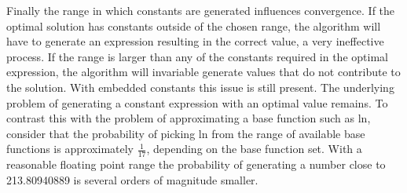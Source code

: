 \documentclass[10pt]{extarticle}
\begin{document}
Finally the range in which constants are generated influences convergence. If the optimal solution has constants outside of the chosen range, the algorithm will have to generate an expression resulting in the correct value, a very ineffective process. If the range is larger than any of the constants required in the optimal expression, the algorithm will invariable generate values that do not contribute to the solution. 
With embedded constants this issue is still present. The underlying problem of generating a constant expression with an optimal value remains. 
To contrast this with the problem of approximating a base function such as ln, consider that the probability of picking ln from the range of available base functions is approximately $\frac{1}{17}$, depending on the base function set. With a reasonable floating point range the probability of generating a number close to 213.80940889 is several orders of magnitude smaller.
\end{document}

